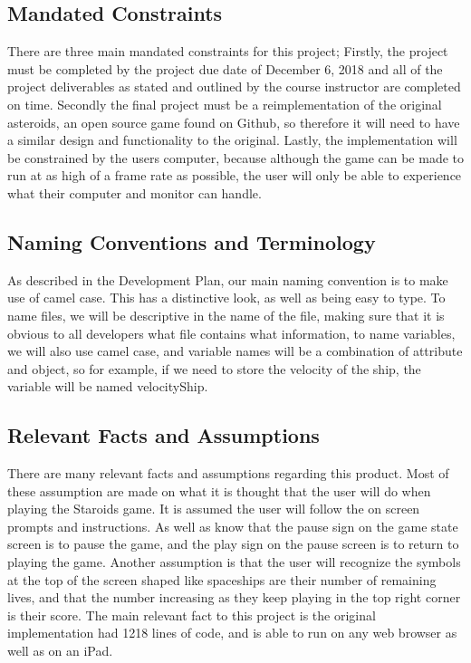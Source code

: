 \documentclass[12pt, titlepage]{article}
\begin{document}
\subsection{Mandated Constraints}
There are three main mandated constraints for this project; Firstly, the project must be completed by the project due date of December 6, 2018 and all of the project deliverables as stated and outlined by the course instructor are completed on time. Secondly the final project must be a reimplementation of the original  asteroids, an open source game found on Github, so therefore it will need to have a similar design and functionality to the original. Lastly, the implementation will be constrained by the users computer, because although the game can be made to run at as high of a frame rate as possible, the user will only be able to experience what their computer and monitor can handle.\\

\subsection{Naming Conventions and Terminology}
As described in the Development Plan, our main naming convention is to make use of camel case. This has a distinctive look, as well as being easy to type. To name files, we will be descriptive in the name of the file, making sure that it is obvious to all developers what file contains what information, to name variables, we will also use camel case, and variable names will be a combination of attribute and object, so for example, if we need to store the velocity of the ship, the variable will be named velocityShip.\\

\subsection{Relevant Facts and Assumptions}
There are many relevant facts and assumptions regarding this product. Most of these assumption are made on what it is thought that the user will do when playing the Staroids game. It is assumed the user will follow the on screen prompts and instructions. As well as know that the pause sign on the game state screen is to pause the game, and the play sign on the pause screen is to return to playing the game. Another assumption is that the user will recognize the symbols at the top of the screen shaped like spaceships are their number of remaining lives, and that the number increasing as they keep playing in the top right corner is their score. The main relevant fact to this project is the original implementation had 1218 lines of code, and is able to run on any web browser as well as on an iPad.\\
\end{document}
